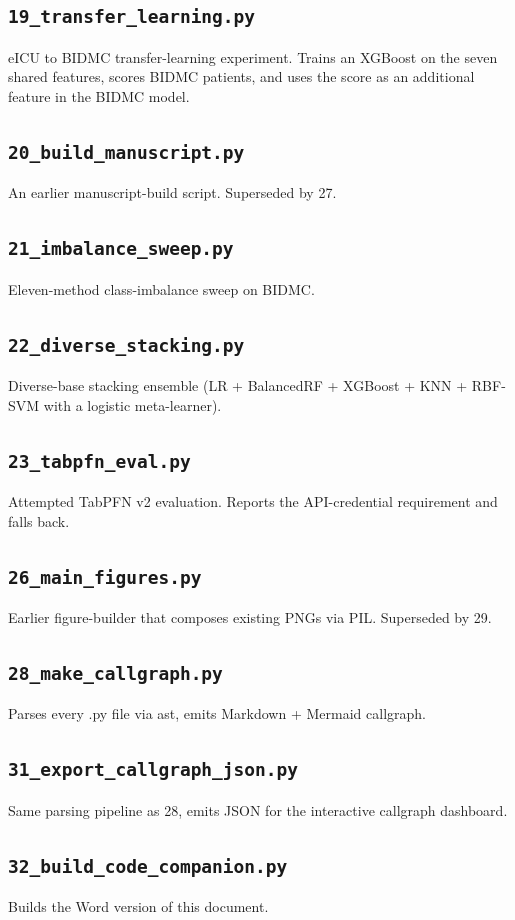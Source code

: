 \documentclass[11pt,a4paper]{article}
\begin{document}
\subsection{\texttt{19\_transfer\_learning.py}}
eICU to BIDMC transfer-learning experiment. Trains an XGBoost on the seven shared features, scores BIDMC patients, and uses the score as an additional feature in the BIDMC model.
\subsection{\texttt{20\_build\_manuscript.py}}
An earlier manuscript-build script. Superseded by 27.
\subsection{\texttt{21\_imbalance\_sweep.py}}
Eleven-method class-imbalance sweep on BIDMC.
\subsection{\texttt{22\_diverse\_stacking.py}}
Diverse-base stacking ensemble (LR + BalancedRF + XGBoost + KNN + RBF-SVM with a logistic meta-learner).
\subsection{\texttt{23\_tabpfn\_eval.py}}
Attempted TabPFN v2 evaluation. Reports the API-credential requirement and falls back.
\subsection{\texttt{26\_main\_figures.py}}
Earlier figure-builder that composes existing PNGs via PIL. Superseded by 29.
\subsection{\texttt{28\_make\_callgraph.py}}
Parses every .py file via ast, emits Markdown + Mermaid callgraph.
\subsection{\texttt{31\_export\_callgraph\_json.py}}
Same parsing pipeline as 28, emits JSON for the interactive callgraph dashboard.
\subsection{\texttt{32\_build\_code\_companion.py}}
Builds the Word version of this document.
\end{document}
